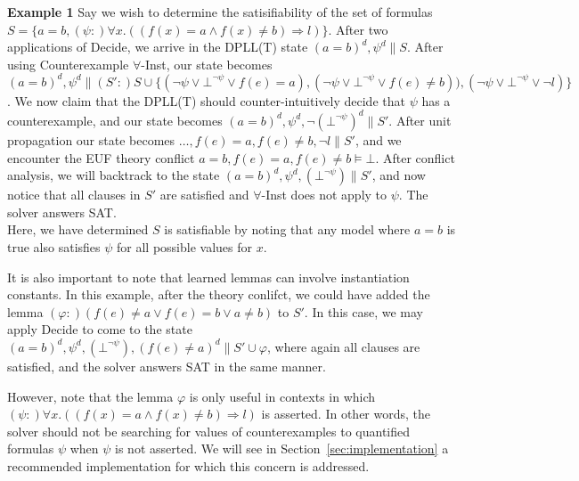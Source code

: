 \documentclass{llncs}
\begin{document}
{\bf Example 1}
Say we wish to determine the satisifiability of the set of formulas $S = \{ a = b, (\psi :) \forall x. ((f(x) = a \wedge f(x) \neq b) \Rightarrow l) \}$.
After two applications of Decide, we arrive in the DPLL(T) state $( a = b )^d, \psi^d \parallel S$.
After using Counterexample $\forall$-Inst, our state becomes $( a = b )^d, \psi^d \parallel (S':) S \cup \{ (\neg \psi \vee \bot^{\neg \psi} \vee f( e ) = a), (\neg \psi \vee \bot^{\neg \psi} \vee f( e ) \neq b)), (\neg \psi \vee \bot^{\neg \psi} \vee \neg l) \}$.
We now claim that the DPLL(T) should counter-intuitively decide that $\psi$ has a counterexample, and our state becomes $( a = b )^d, \psi^d, \neg (\bot^{\neg \psi})^d \parallel S'$. 
After unit propagation our state becomes $\ldots, f( e ) = a, f( e ) \neq b, \neg l \parallel S'$, and we encounter the EUF theory conflict $a = b, f( e ) = a, f( e ) \neq b \models \bot$.
After conflict analysis, we will backtrack to the state $( a = b )^d, \psi^d, (\bot^{\neg \psi}) \parallel S'$, and now notice that all clauses in $S'$ are satisfied and $\forall$-Inst does not apply to $\psi$.
The solver answers SAT. \\

Here, we have determined $S$ is satisfiable by noting that any model where $a = b$ is true also satisfies $\psi$ for all possible values for $x$.

It is also important to note that learned lemmas can involve instantiation constants.
In this example, after the theory conlifct, we could have added the lemma $(\varphi : ) ( f( e ) \neq a \vee f( e ) = b \vee a \neq b )$ to $S'$.
In this case, we may apply Decide to come to the state $( a = b )^d, \psi^d, (\bot^{\neg \psi}), (f( e ) \neq a)^d \parallel S' \cup \varphi$, where again all clauses are satisfied, and the solver answers SAT in the same manner.

However, note that the lemma $\varphi$ is only useful in contexts in which $(\psi :) \forall x. ((f(x) = a \wedge f(x) \neq b) \Rightarrow l)$ is asserted.
In other words, the solver should not be searching for values of counterexamples to quantified formulas $\psi$ when $\psi$ is not asserted.
We will see in Section~\ref{sec:implementation} a recommended implementation for which this concern is addressed.

\end{document}
